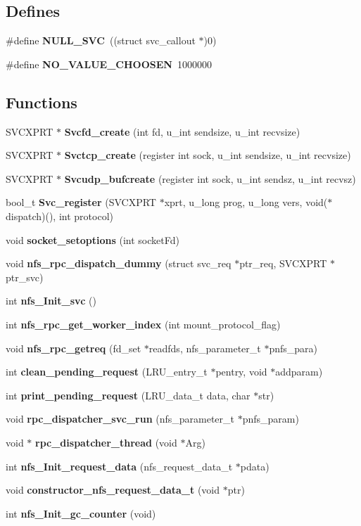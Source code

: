\subsection*{Defines}
\begin{DoxyCompactItemize}
\item 
\#define {\bf NULL\_\-SVC}~((struct svc\_\-callout $\ast$)0)
\item 
\#define {\bf NO\_\-VALUE\_\-CHOOSEN}~1000000
\end{DoxyCompactItemize}
\subsection*{Functions}
\begin{DoxyCompactItemize}
\item 
SVCXPRT $\ast$ {\bf Svcfd\_\-create} (int fd, u\_\-int sendsize, u\_\-int recvsize)
\item 
SVCXPRT $\ast$ {\bf Svctcp\_\-create} (register int sock, u\_\-int sendsize, u\_\-int recvsize)
\item 
SVCXPRT $\ast$ {\bf Svcudp\_\-bufcreate} (register int sock, u\_\-int sendsz, u\_\-int recvsz)
\item 
bool\_\-t {\bf Svc\_\-register} (SVCXPRT $\ast$xprt, u\_\-long prog, u\_\-long vers, void($\ast$dispatch)(), int protocol)
\item 
void {\bf socket\_\-setoptions} (int socketFd)
\item 
void {\bf nfs\_\-rpc\_\-dispatch\_\-dummy} (struct svc\_\-req $\ast$ptr\_\-req, SVCXPRT $\ast$ptr\_\-svc)
\item 
int {\bf nfs\_\-Init\_\-svc} ()
\item 
int {\bf nfs\_\-rpc\_\-get\_\-worker\_\-index} (int mount\_\-protocol\_\-flag)
\item 
void {\bf nfs\_\-rpc\_\-getreq} (fd\_\-set $\ast$readfds, nfs\_\-parameter\_\-t $\ast$pnfs\_\-para)
\item 
int {\bf clean\_\-pending\_\-request} (LRU\_\-entry\_\-t $\ast$pentry, void $\ast$addparam)
\item 
int {\bf print\_\-pending\_\-request} (LRU\_\-data\_\-t data, char $\ast$str)
\item 
void {\bf rpc\_\-dispatcher\_\-svc\_\-run} (nfs\_\-parameter\_\-t $\ast$pnfs\_\-param)
\item 
void $\ast$ {\bf rpc\_\-dispatcher\_\-thread} (void $\ast$Arg)
\item 
int {\bf nfs\_\-Init\_\-request\_\-data} (nfs\_\-request\_\-data\_\-t $\ast$pdata)
\item 
void {\bf constructor\_\-nfs\_\-request\_\-data\_\-t} (void $\ast$ptr)
\item 
int {\bf nfs\_\-Init\_\-gc\_\-counter} (void)
\end{DoxyCompactItemize}
